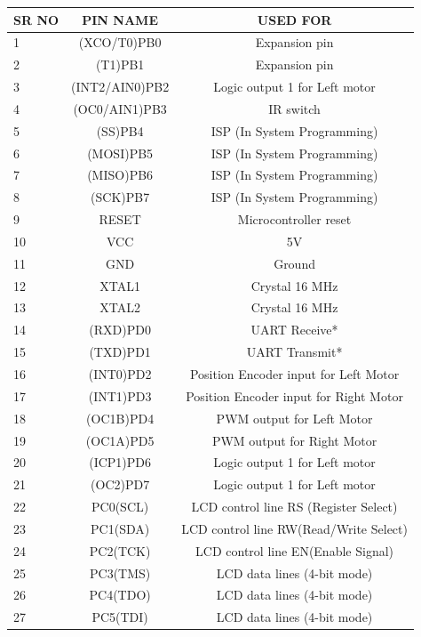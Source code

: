 \documentclass[a4paper,12pt,oneside]{book}
\begin{document}
\begin{itemize}
\begin{tabular*}{\textwidth}{|l|c|c|}
	\hline
	SR NO & PIN NAME & USED FOR \\
	\hline
	1 & (XCO/T0)PB0 & Expansion pin\\
	\hline
	2 & (T1)PB1 & Expansion pin\\
	\hline
	3 & (INT2/AIN0)PB2 & Logic output 1 for Left motor\\
	\hline
	4 & (OC0/AIN1)PB3 & IR switch \\
	\hline
	5 & (SS)PB4 & ISP (In System Programming) \\
	\hline
	6 & (MOSI)PB5 & ISP (In System Programming) \\
	\hline
	7 & (MISO)PB6 & ISP (In System Programming) \\
	\hline
	8 & (SCK)PB7 & ISP (In System Programming) \\
	\hline
	9 & RESET & Microcontroller reset \\
	\hline
	10 & VCC & 5V \\
	\hline
	11 & GND & Ground \\
	\hline
	12 & XTAL1 & Crystal 16 MHz \\
	\hline
	13 & XTAL2 & Crystal 16 MHz \\
	\hline
	14 & (RXD)PD0 & UART Receive* \\
	\hline
	15 & (TXD)PD1 & UART Transmit* \\
	\hline
	16 & (INT0)PD2 & Position Encoder input for Left Motor \\
	\hline
	17 & (INT1)PD3 & Position Encoder input for Right Motor \\
	\hline
	18 & (OC1B)PD4 & PWM output for Left Motor \\
	\hline
	19 & (OC1A)PD5 & PWM output for Right Motor  \\
	\hline
	20 & (ICP1)PD6 & Logic output 1 for Left motor \\
	\hline
	21 & (OC2)PD7 & Logic output 1 for Left motor \\
	\hline
	22 & PC0(SCL) & LCD control line RS (Register Select) \\
	\hline
	23 & PC1(SDA) & LCD control line RW(Read/Write Select) \\
	\hline
	24 & PC2(TCK) & LCD control line EN(Enable Signal) \\
	\hline
	25 & PC3(TMS) & LCD data lines (4-bit mode) \\
	\hline
	26 & PC4(TDO) & LCD data lines (4-bit mode) \\
	\hline
	27 & PC5(TDI) & LCD data lines (4-bit mode) \\

\end{tabular*}
\end{itemize}
\end{document}
